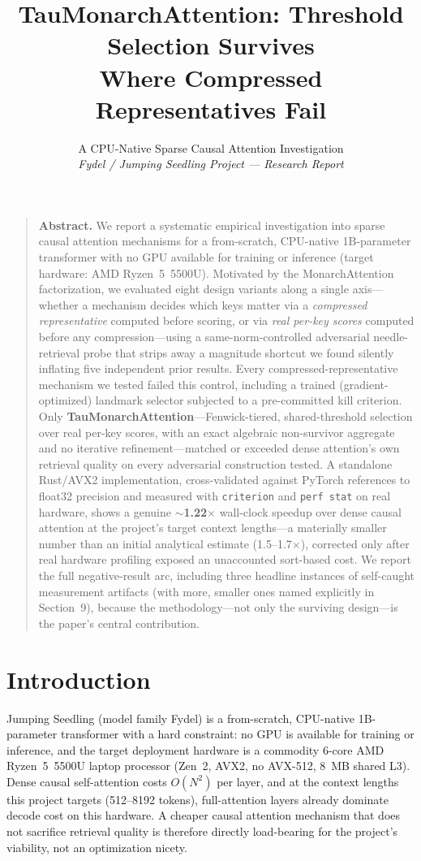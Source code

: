 \documentclass[11pt]{article}
\title{\vspace{-1.5em}TauMonarchAttention: Threshold Selection Survives\\Where Compressed Representatives Fail}
\author{A CPU-Native Sparse Causal Attention Investigation\\[0.3em]\normalsize\itshape Fydel / Jumping Seedling Project --- Research Report}
\date{}
\begin{document}
\maketitle
\vspace{-2em}

\begin{quote}
\small
\noindent\textbf{Abstract.}
We report a systematic empirical investigation into sparse causal attention mechanisms
for a from-scratch, CPU-native 1B-parameter transformer with no GPU available for
training or inference (target hardware: AMD Ryzen~5~5500U). Motivated by the
MonarchAttention factorization, we evaluated eight design variants along a single
axis---whether a mechanism decides which keys matter via a \emph{compressed
representative} computed before scoring, or via \emph{real per-key scores} computed
before any compression---using a same-norm-controlled adversarial needle-retrieval
probe that strips away a magnitude shortcut we found silently inflating five independent
prior results. Every compressed-representative mechanism we tested failed this control,
including a trained (gradient-optimized) landmark selector subjected to a pre-committed
kill criterion. Only \textbf{TauMonarchAttention}---Fenwick-tiered, shared-threshold
selection over real per-key scores, with an exact algebraic non-survivor aggregate and no
iterative refinement---matched or exceeded dense attention's own retrieval quality on
every adversarial construction tested. A standalone Rust/AVX2 implementation, cross-validated
against PyTorch references to float32 precision and measured with \texttt{criterion}
and \texttt{perf stat} on real hardware, shows a genuine
\textbf{$\sim$1.22$\times$} wall-clock speedup over dense causal attention at the
project's target context lengths---a materially smaller number than an initial analytical
estimate (1.5--1.7$\times$), corrected only after real hardware profiling exposed an
unaccounted sort-based cost. We report the full negative-result arc, including three
headline instances of self-caught measurement artifacts (with more, smaller ones named
explicitly in Section~9), because the methodology---not only the surviving design---is
the paper's central contribution.
\end{quote}

\section{Introduction}

Jumping Seedling (model family Fydel) is a from-scratch, CPU-native 1B-parameter
transformer with a hard constraint: no GPU is available for training or inference, and the
target deployment hardware is a commodity 6-core AMD Ryzen~5~5500U laptop
processor (Zen~2, AVX2, no AVX-512, 8~MB shared L3). Dense causal
self-attention costs $O(N^2)$ per layer, and at the context lengths this project
targets (512--8192 tokens), full-attention layers already dominate decode cost on this
hardware. A cheaper causal attention mechanism that does not sacrifice retrieval quality
is therefore directly load-bearing for the project's viability, not an optimization
nicety.
\end{document}
